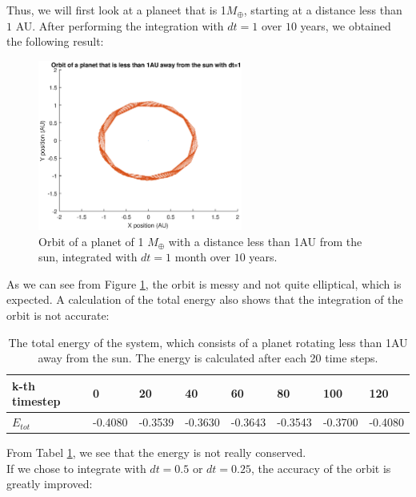 Thus, we will first look at a planeet that is 1$M_{\oplus}$, starting at a distance less than $1$ AU. 
After performing the integration with $dt=1$ over $10$ years, we obtained the following result:

\begin{figure}[H]
\centering
\includegraphics[width=0.6\textwidth]{Planeet_1AU_dt1_10jaar.eps}
\caption{Orbit of a planet of 1 $M_{\oplus}$ with a distance less than 1AU from the sun, integrated with $dt=1$ month over $10$ years.}
    \label{fig:Planet1AUdt1}
\end{figure}

As we can see from Figure \ref{fig:Planet1AUdt1}, the orbit is messy and not quite elliptical, which is expected. 
A calculation of the total energy also shows that the integration of the orbit is not accurate:\\

\begin{table}[htb]
\centering
\caption{The total energy of the system, which consists of a planet rotating less than 1AU away from the sun. The energy is calculated after each 20 time steps.}
\begin{tabular}{|l|l|l|l|l|l|l|l|}
\hline
k-th timestep&0&20&40&60&80&100&120\\ \hline
$E_{tot}$&-0.4080& -0.3539&   -0.3630&   -0.3643&   -0.3543&-0.3700&-0.4080\\ \hline
\end{tabular}
\label{tab:Planet1AUEnergy}
\end{table}

From Tabel \ref{tab:Planet1AUEnergy}, we see that the energy is not really conserved.\\

If we chose to integrate with $dt=0.5$ or $dt=0.25$, the accuracy of the orbit is greatly improved:

